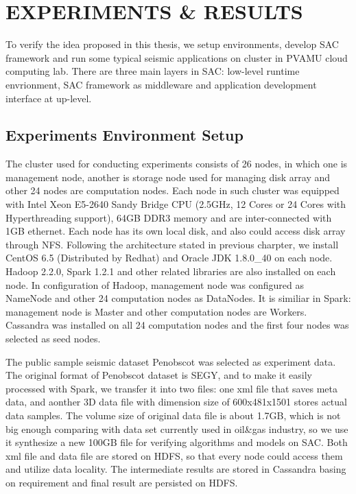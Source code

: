 %
%
%


\chapter{\uppercase{Experiments \& Results}}
To verify the idea proposed in this thesis, we setup environments, develop SAC framework and run some typical seismic applications on cluster in PVAMU cloud computing lab. There are three main layers in SAC: low-level runtime envrionment, SAC framework as middleware and application development interface at up-level. 

\section{Experiments Environment Setup}

The cluster used for conducting experiments consists of 26 nodes, in which one is management node, another is storage node used for managing disk array and other 24 nodes are computation nodes. Each node in such cluster was equipped with Intel Xeon E5-2640 Sandy Bridge CPU (2.5GHz, 12 Cores or 24 Cores with Hyperthreading support), 64GB DDR3 memory and are inter-connected with 1GB ethernet. Each node has its own local disk, and also could access disk array through NFS. Following the architecture stated in previous charpter, we install CentOS 6.5 (Distributed by Redhat) and Oracle JDK 1.8.0\_40 on each node. Hadoop 2.2.0, Spark 1.2.1 and other related libraries are also installed on each node. In configuration of Hadoop, management node was configured as NameNode and other 24 computation nodes as DataNodes. It is similiar in Spark: management node is Master and other computation nodes are Workers. Cassandra was installed on all 24 computation nodes and the first four nodes was selected as seed nodes.

The public sample seismic dataset Penobscot \cite{PenobscotData} was selected as experiment data. The original format of Penobscot dataset is SEGY, and to make it easily processed with Spark, we transfer it into two files: one xml file that saves meta data, and aonther 3D data file with dimension size of 600x481x1501 stores actual data samples. The volume size of original data file is about 1.7GB, which is not big enough comparing with data set currently used in oil\&gas industry, so we use it synthesize a new 100GB file for verifying algorithms and models on SAC. Both xml file and data file are stored on HDFS, so that every node could access them and utilize data locality. The intermediate results are stored in Cassandra basing on requirement and final result are persisted on HDFS. 

